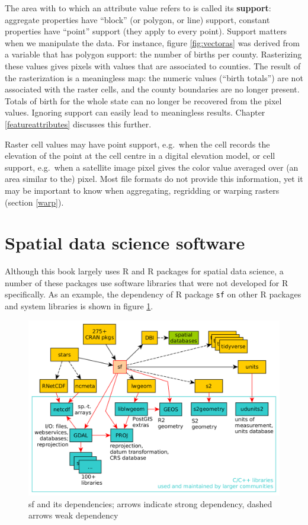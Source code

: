 \documentclass[]{book}
\begin{document}
The area with to which an attribute value refers to is called its
\textbf{support}: aggregate properties have ``block'' (or polygon, or line)
support, constant properties have ``point'' support (they apply to
every point). Support matters when we manipulate the data. For
instance, figure \ref{fig:vectoras} was derived from a variable that has
polygon support: the number of births per county. Rasterizing these
values gives pixels with values that are associated to counties.
The result of the rasterization is a meaningless map: the numeric
values (``birth totals'') are not associated with the raster cells,
and the county boundaries are no longer present. Totals of birth for
the whole state can no longer be recovered from the pixel values.
Ignoring support can easily lead to meaningless results. Chapter
\ref{featureattributes} discusses this further.

Raster cell values may have point support, e.g.~when the cell records
the elevation of the point at the cell centre in a digital elevation
model, or cell support, e.g.~when a satellite image pixel gives the
color value averaged over (an area similar to the) pixel. Most file
formats do not provide this information, yet it may be important
to know when aggregating, regridding or warping rasters (section
\ref{warp}).

\hypertarget{spatial-data-science-software}{%
\section{Spatial data science software}\label{spatial-data-science-software}}

Although this book largely uses R and R packages for spatial data
science, a number of these packages use software libraries that were
not developed for R specifically. As an example, the dependency
of R package \texttt{sf} on other R packages and system libraries is shown
in figure \ref{fig:gdal-fig-nodetails}.

\begin{figure}

{\centering \includegraphics[width=1\linewidth]{images/sf_deps} 

}

\caption{sf and its dependencies; arrows indicate strong dependency, dashed arrows weak dependency}\label{fig:gdal-fig-nodetails}
\end{figure}
\end{document}

